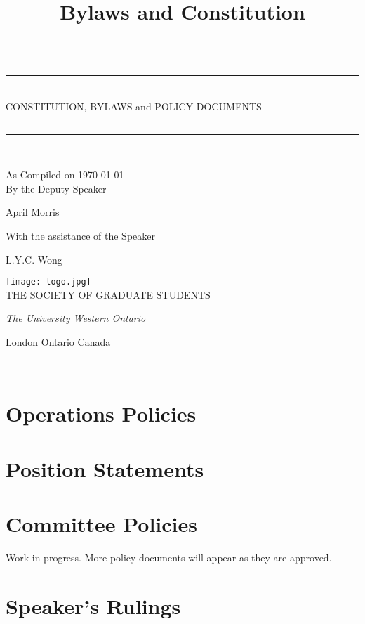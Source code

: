 \documentclass[12pt,letterpaper,oneside]{book}
\title{Bylaws and Constitution}
\newcommand*{\titleGP}{\begingroup %
\centering %
\vspace*{\baselineskip} %

\rule{\textwidth}{1.6pt}\vspace*{-\baselineskip}\vspace*{2pt} %
\rule{\textwidth}{0.4pt}\\[\baselineskip] %

{\LARGE CONSTITUTION, BYLAWS} 
and
{\LARGE POLICY DOCUMENTS}

\rule{\textwidth}{0.4pt}\vspace*{-\baselineskip}\vspace{3.2pt} %
\rule{\textwidth}{1.6pt}\\[\baselineskip] %



\vspace*{2\baselineskip} %

As Compiled on \today \\[\baselineskip]
By the Deputy Speaker

{\Large April Morris \par} %
\vspace*{\baselineskip} %
With the assistance of the Speaker \\[\baselineskip]
{\large L.Y.C. Wong \par}


\vfill %

\texttt{[image: logo.jpg]}\\[1cm]


{\large THE SOCIETY OF GRADUATE STUDENTS}\par %
\scshape %
{\itshape The University Western Ontario\par} %
London Ontario Canada\par %
\the\year \\[0.3\baselineskip] %
\endgroup}
\begin{document}
 

\pagestyle{empty} %

\titleGP %

\tableofcontents %
\pagebreak %
\pagestyle{plain}






%

%
%


%
\chapter{Operations Policies}






\chapter{Position Statements}


\chapter{Committee Policies}
Work in progress. More policy documents will appear as they are approved.


%











\chapter{Speaker's Rulings}



\newpage
 
%
\printindex
\end{document}
